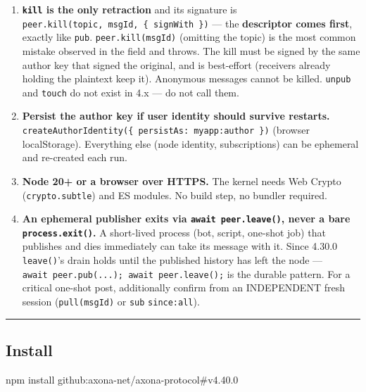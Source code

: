 \documentclass[
  nobib]{tufte-handout}
\newenvironment{Shaded}{}{}
\newcommand{\ExtensionTok}[1]{#1}
\newcommand{\NormalTok}[1]{#1}
\begin{document}
\begin{enumerate}
  ceiling). Re-publishing the identical payload from the same author
  yields the SAME msgId and refreshes the hold (an upsert; subscribers
  are not re-notified). Axona is a live messaging fabric, not permanent
  storage.
\item
  \textbf{\texttt{kill} is the only retraction} and its signature is
  \texttt{peer.kill(topic,\ msgId,\ \{\ signWith\ \})} --- the
  \textbf{descriptor comes first}, exactly like \texttt{pub}.
  \texttt{peer.kill(msgId)} (omitting the topic) is the most common
  mistake observed in the field and throws. The kill must be signed by
  the same author key that signed the original, and is best-effort
  (receivers already holding the plaintext keep it). Anonymous messages
  cannot be killed. \texttt{unpub} and \texttt{touch} do not exist in
  4.x --- do not call them.
\item
  \textbf{Persist the author key if user identity should survive
  restarts.}
  \texttt{createAuthorIdentity(\{\ persistAs:\ \textquotesingle{}myapp:author\textquotesingle{}\ \})}
  (browser localStorage). Everything else (node identity, subscriptions)
  can be ephemeral and re-created each run.
\item
  \textbf{Node 20+ or a browser over HTTPS.} The kernel needs Web Crypto
  (\texttt{crypto.subtle}) and ES modules. No build step, no bundler
  required.
\item
  \textbf{An ephemeral publisher exits via \texttt{await\ peer.leave()},
  never a bare \texttt{process.exit()}.} A short-lived process (bot,
  script, one-shot job) that publishes and dies immediately can take its
  message with it. Since 4.30.0 \texttt{leave()}'s drain holds until the
  published history has left the node ---
  \texttt{await\ peer.pub(...);\ await\ peer.leave();} is the durable
  pattern. For a critical one-shot post, additionally confirm from an
  INDEPENDENT fresh session (\texttt{pull(msgId)} or \texttt{sub}
  \texttt{since:\textquotesingle{}all\textquotesingle{}}).
\end{enumerate}

\begin{center}\rule{0.5\linewidth}{0.5pt}\end{center}

\subsection{Install}\label{install}

\begin{Shaded}
\begin{Highlighting}[]
\ExtensionTok{npm}\NormalTok{ install github:axona{-}net/axona{-}protocol\#v4.40.0}
\end{Highlighting}
\end{Shaded}
\end{document}
